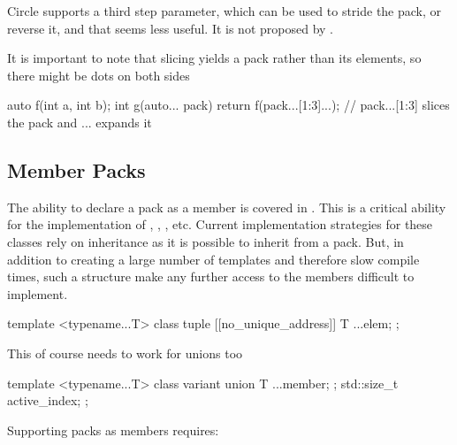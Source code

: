 \documentclass{wg21}
\begin{document}
Circle supports a third step parameter, which can be used to stride the pack, or reverse it,
and that seems less useful. It is not proposed by .

It is important to note that slicing yields a pack rather than its elements, so there might be dots on both sides

\begin{colorblock}
auto f(int a, int b);
int g(auto... pack) {
    return f(pack...[1:3]...); // pack...[1:3] slices the pack and ... expands it
}
\end{colorblock}

\subsection{Member Packs}

The ability to declare a pack as a member is covered in .
This is a critical ability for the implementation of , , , etc.
Current implementation strategies for these classes rely on inheritance as it is possible to inherit from a pack.
But, in addition to creating a large number of templates and therefore slow compile times, such a structure make any further access to the members
difficult to implement.

\begin{colorblock}
template <typename...T>
class tuple {
    [[no_unique_address]] T ...elem;
};
\end{colorblock}

This of course needs to work for unions too

\begin{colorblock}
template <typename...T>
class variant {
    union {
        T ...member;
    };
    std::size_t active_index;
};
\end{colorblock}

Supporting packs as members requires:
\end{document}
